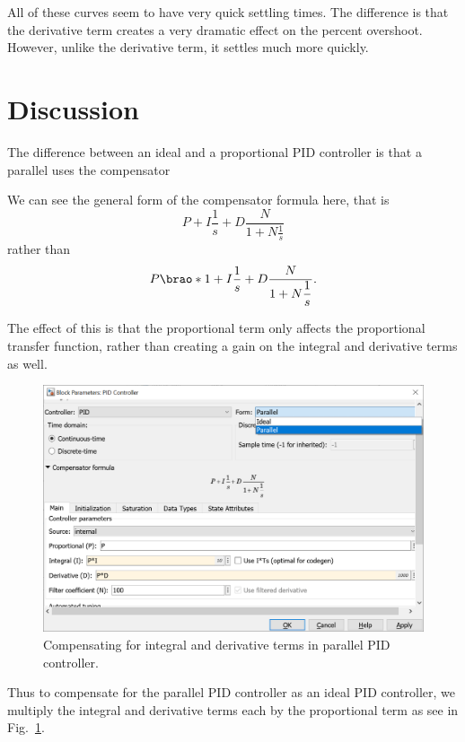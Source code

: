 \documentclass[12pt]{article}
\DeclarePairedDelimiter\brao()%
\begin{document}
All of these curves seem to have very quick settling times. The difference is that the derivative term creates a very dramatic effect on the percent overshoot. However, unlike the derivative term, it settles much more quickly.

\section{Discussion}

The difference between an ideal and a proportional PID controller is that a parallel uses the compensator

We can see the general form of the compensator formula here, that is
\begin{equation}
    P + I\frac1s + D\frac{N}{\displaystyle1 + N\frac1s}
\end{equation}
rather than
\begin{equation}
    P\brao*{1 + I\frac1s + D\frac{N}{\displaystyle1 + N\frac1s}}.
\end{equation}

The effect of this is that the proportional term only affects the proportional transfer function, rather than creating a gain on the integral and derivative terms as well.

\begin{figure}
    \centering
    \includegraphics[width=\linewidth]{img/discussion_parallel_pid.png}
    \caption{Compensating for integral and derivative terms in parallel PID controller.}
    \label{fig:parallel pid controller block parameters}
\end{figure}

Thus to compensate for the parallel PID controller
as an ideal PID controller,
we multiply the integral and derivative terms each by the proportional term
as see in Fig.~\ref{fig:parallel pid controller block parameters}.
\end{document}
